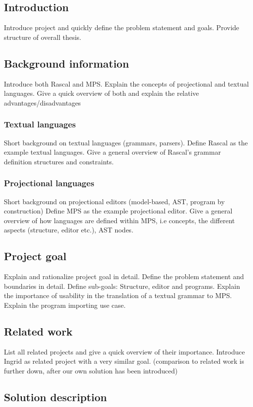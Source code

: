 \documentclass[a4paper, 11pt]{article}
\begin{document}
	\subsection*{Introduction}
		Introduce project and quickly define the problem statement and goals. Provide structure of overall thesis.
	\subsection*{Background information}
		Introduce both Rascal and MPS. Explain the concepts of projectional and textual languages. Give a quick overview of both and explain the relative advantages/disadvantages
		\subsubsection*{Textual languages}
			Short background on textual languages (grammars, parsers).
			Define Rascal as the example textual languages. Give a general overview of Rascal's grammar definition structures and constraints.
		\subsubsection*{Projectional languages}
			Short background on projectional editors (model-based, AST, program by construction)
			Define MPS as the example projectional editor. Give a general overview of how languages are defined within MPS, i.e concepts, the different aspects (structure, editor etc.), AST nodes. 
	\subsection*{Project goal}
		Explain and rationalize project goal in detail. Define the problem statement and boundaries in detail. Define sub-goals: Structure, editor and programs. Explain the importance of usability in the translation of a textual grammar to MPS. Explain the program importing use case.
	\subsection*{Related work}
		List all related projects and give a quick overview of their importance. Introduce Ingrid as related project with a very similar goal. (comparison to related work is further down, after our own solution has been introduced)
	\subsection*{Solution description}
\end{document}
